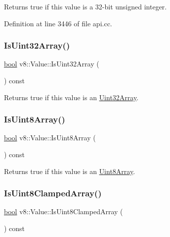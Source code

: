 Returns true if this value is a 32-\/bit unsigned integer. 

Definition at line 3446 of file api.\+cc.

\mbox{\label{classv8_1_1Value_a52fe549df18b0c77a875d7aa61f87317}} 
\subsubsection{\texorpdfstring{Is\+Uint32\+Array()}{IsUint32Array()}}
{\footnotesize\ttfamily \mbox{\hyperlink{classbool}{bool}} v8\+::\+Value\+::\+Is\+Uint32\+Array (\begin{DoxyParamCaption}{ }\end{DoxyParamCaption}) const}

Returns true if this value is an \mbox{\hyperlink{classv8_1_1Uint32Array}{Uint32\+Array}}. \mbox{\label{classv8_1_1Value_af11d828f1a78df0de696e210571b7860}} 
\subsubsection{\texorpdfstring{Is\+Uint8\+Array()}{IsUint8Array()}}
{\footnotesize\ttfamily \mbox{\hyperlink{classbool}{bool}} v8\+::\+Value\+::\+Is\+Uint8\+Array (\begin{DoxyParamCaption}{ }\end{DoxyParamCaption}) const}

Returns true if this value is an \mbox{\hyperlink{classv8_1_1Uint8Array}{Uint8\+Array}}. \mbox{\label{classv8_1_1Value_a655a46fa71c8a33d138756d8a6c515ac}} 
\subsubsection{\texorpdfstring{Is\+Uint8\+Clamped\+Array()}{IsUint8ClampedArray()}}
{\footnotesize\ttfamily \mbox{\hyperlink{classbool}{bool}} v8\+::\+Value\+::\+Is\+Uint8\+Clamped\+Array (\begin{DoxyParamCaption}{ }\end{DoxyParamCaption}) const}

